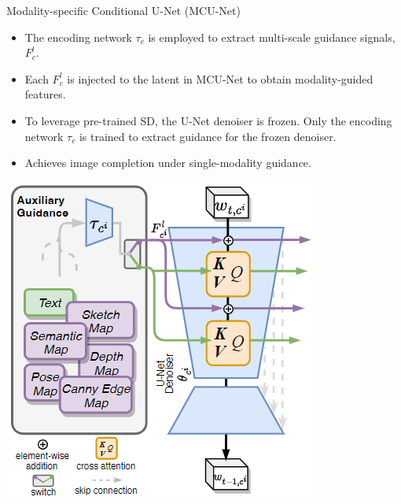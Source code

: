 \documentclass[pdf]{beamer}
\begin{document}
\begin{frame}{Modality-specific Conditional U-Net (MCU-Net)}
    \begin{minipage}{0.65\textwidth}
        \begin{itemize}
            \item The encoding network $\tau_c$ is employed to extract multi-scale guidance signals, $F_c^l$.
            \item Each $F_c^l$ is injected to the latent in MCU-Net to obtain modality-guided features.
            \item To leverage pre-trained SD, the U-Net denoiser is frozen. Only the encoding network $\tau_c$ is trained to extract guidance for the frozen denoiser.
            \item Achieves image completion under single-modality guidance.
        \end{itemize}
    \end{minipage}%
    \begin{minipage}{0.35\textwidth}
        \centering
        \includegraphics[width=\linewidth]{figures/mcu_net.png}
    \end{minipage}
\end{frame}
\end{document}
